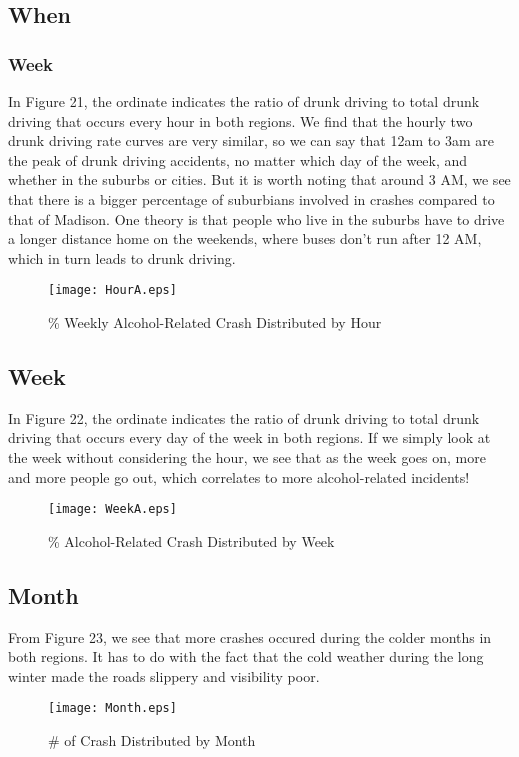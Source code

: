 \documentclass[15pt]{article}
\begin{document}
\subsection{When}
\label{sec:When1}
\subsubsection{Week}
In Figure 21, the ordinate indicates the ratio of drunk driving to total drunk driving that occurs every hour in both regions. We find that the hourly two drunk driving rate curves are very similar, so we can say that 12am to 3am are the peak of drunk driving accidents, no matter which day of the week, and whether in the suburbs or cities. But it is worth noting that around 3 AM, we see that there is a bigger percentage of suburbians involved in crashes compared to that of Madison. One theory is that people who live in the suburbs have to drive a longer distance home on the weekends, where buses don’t run after 12 AM, which in turn leads to drunk driving.
\begin{figure}[H]
\flushleft
\texttt{[image: HourA.eps]}
\caption{\% Weekly Alcohol-Related Crash Distributed by Hour}
\end{figure}

\newpage
\subsection{Week}
\label{sec:Week}
In Figure 22, the ordinate indicates the ratio of drunk driving to total drunk driving that occurs every day of the week in both regions. If we simply look at the week without considering the hour, we see that as the week goes on, more and more people go out, which correlates to more alcohol-related incidents!
\begin{figure}[H]
\flushleft
\texttt{[image: WeekA.eps]}
\caption{\% Alcohol-Related Crash Distributed by Week}
\end{figure}

\newpage
\subsection{Month}
From Figure 23, we see that more crashes occured during the colder months in both regions. It has to do with the fact that the cold weather during the long winter made the roads slippery and visibility poor.
\begin{figure}[H]
\flushleft
\texttt{[image: Month.eps]}
\caption{\# of Crash Distributed by Month}
\end{figure}
\end{document}
